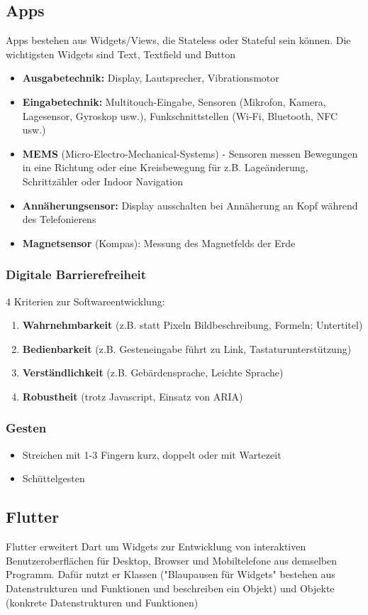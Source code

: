 \documentclass[12pt,landscape]{article}
\begin{document}
\begin{multicols}{3}
\subsection{Apps}
Apps bestehen aus Widgets/Views, die Stateless oder Stateful sein können. Die wichtigsten Widgets sind Text, Textfield und Button
\begin{itemize}
\item \textbf{Ausgabetechnik:} Display, Lautsprecher, Vibrationsmotor
\item \textbf{Eingabetechnik:} Multitouch-Eingabe, Sensoren (Mikrofon, Kamera, Lagesensor, Gyroskop usw.), Funkschnittstellen (Wi-Fi, Bluetooth, NFC usw.)
\item \textbf{MEMS} (Micro-Electro-Mechanical-Systems) - Sensoren messen Bewegungen in eine Richtung oder eine Kreisbewegung für z.B. Lageänderung, Schrittzähler oder Indoor Navigation
\item \textbf{Annäherungsensor:} Display ausschalten bei Annäherung an Kopf während des Telefonierens
\item \textbf{Magnetsensor} (Kompas): Messung des Magnetfelds der Erde
\end{itemize}
\subsubsection{Digitale Barrierefreiheit}
4 Kriterien zur Softwareentwicklung:
\begin{enumerate}
\item \textbf{Wahrnehmbarkeit} (z.B. statt Pixeln Bildbeschreibung, Formeln; Untertitel)
\item \textbf{Bedienbarkeit} (z.B. Gesteneingabe führt zu Link, Tastaturunterstützung)
\item \textbf{Verständlichkeit} (z.B. Gebärdensprache, Leichte Sprache)
\item \textbf{Robustheit} (trotz Javascript, Einsatz von ARIA) 
\end{enumerate}
\subsubsection{Gesten}
\begin{itemize}
\item Streichen mit 1-3 Fingern kurz, doppelt oder mit Wartezeit
\item Schüttelgesten
\end{itemize}
\subsection{Flutter}
Flutter erweitert Dart um Widgets zur Entwicklung von interaktiven Benutzeroberflächen für Desktop, Browser und Mobiltelefone aus demselben Programm. Dafür nutzt er Klassen ("Blaupausen für Widgets" bestehen aus Datenstrukturen und 
Funktionen und beschreiben ein Objekt) und Objekte (konkrete Datenstrukturen und Funktionen)

\end{multicols}
\end{document}
